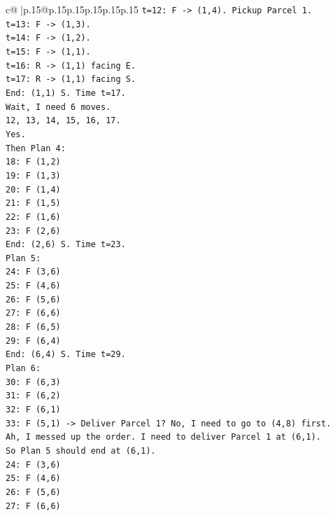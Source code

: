 \documentclass{article}
\begin{document}
{\begin{supertabular}{c@{$\;$}|p{.15\linewidth}@{}p{.15\linewidth}p{.15\linewidth}p{.15\linewidth}p{.15\linewidth}p{.15\linewidth}}
{{{\texttt{t=12: F {-}> (1,4). Pickup Parcel 1.} \\
\texttt{t=13: F {-}> (1,3).} \\
\texttt{t=14: F {-}> (1,2).} \\
\texttt{t=15: F {-}> (1,1).} \\
\texttt{t=16: R {-}> (1,1) facing E.} \\
\texttt{t=17: R {-}> (1,1) facing S.} \\
\texttt{End: (1,1) S. Time t=17.} \\
\texttt{Wait, I need 6 moves.} \\
\texttt{12, 13, 14, 15, 16, 17.} \\
\texttt{Yes.} \\
\texttt{Then Plan 4:} \\
\texttt{18: F (1,2)} \\
\texttt{19: F (1,3)} \\
\texttt{20: F (1,4)} \\
\texttt{21: F (1,5)} \\
\texttt{22: F (1,6)} \\
\texttt{23: F (2,6)} \\
\texttt{End: (2,6) S. Time t=23.} \\
\texttt{Plan 5:} \\
\texttt{24: F (3,6)} \\
\texttt{25: F (4,6)} \\
\texttt{26: F (5,6)} \\
\texttt{27: F (6,6)} \\
\texttt{28: F (6,5)} \\
\texttt{29: F (6,4)} \\
\texttt{End: (6,4) S. Time t=29.} \\
\texttt{Plan 6:} \\
\texttt{30: F (6,3)} \\
\texttt{31: F (6,2)} \\
\texttt{32: F (6,1)} \\
\texttt{33: F (5,1) {-}> Deliver Parcel 1? No, I need to go to (4,8) first.} \\
\texttt{Ah, I messed up the order. I need to deliver Parcel 1 at (6,1).} \\
\texttt{So Plan 5 should end at (6,1).} \\
\texttt{24: F (3,6)} \\
\texttt{25: F (4,6)} \\
\texttt{26: F (5,6)} \\
\texttt{27: F (6,6)} \\
}}}
\end{supertabular}}
\end{document}
